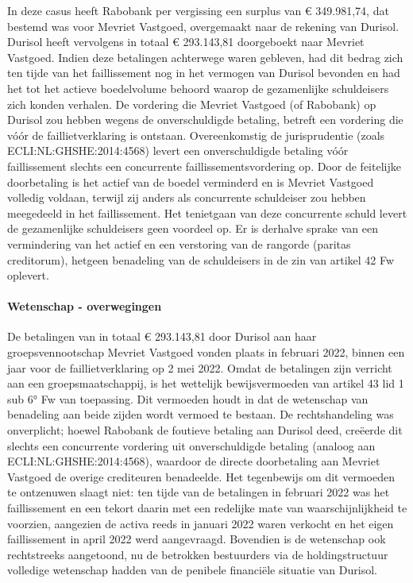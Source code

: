 \documentclass[
  dutch,
  a4paper,
]{article}
\begin{document}
In deze casus heeft Rabobank per vergissing een surplus van € 349.981,74, dat bestemd was voor Mevriet Vastgoed, overgemaakt naar de rekening van Durisol. Durisol heeft vervolgens in totaal € 293.143,81 doorgeboekt naar Mevriet Vastgoed. Indien deze betalingen achterwege waren gebleven, had dit bedrag zich ten tijde van het faillissement nog in het vermogen van Durisol bevonden en had het tot het actieve boedelvolume behoord waarop de gezamenlijke schuldeisers zich konden verhalen. De vordering die Mevriet Vastgoed (of Rabobank) op Durisol zou hebben wegens de onverschuldigde betaling, betreft een vordering die vóór de faillietverklaring is ontstaan. Overeenkomstig de jurisprudentie (zoals ECLI:NL:GHSHE:2014:4568) levert een onverschuldigde betaling vóór faillissement slechts een concurrente faillissementsvordering op. Door de feitelijke doorbetaling is het actief van de boedel verminderd en is Mevriet Vastgoed volledig voldaan, terwijl zij anders als concurrente schuldeiser zou hebben meegedeeld in het faillissement. Het tenietgaan van deze concurrente schuld levert de gezamenlijke schuldeisers geen voordeel op. Er is derhalve sprake van een vermindering van het actief en een verstoring van de rangorde (paritas creditorum), hetgeen benadeling van de schuldeisers in de zin van artikel 42 Fw oplevert.

\paragraph{Wetenschap - overwegingen}\label{wetenschap---overwegingen-14}

De betalingen van in totaal € 293.143,81 door Durisol aan haar groepsvennootschap Mevriet Vastgoed vonden plaats in februari 2022, binnen een jaar voor de faillietverklaring op 2 mei 2022. Omdat de betalingen zijn verricht aan een groepsmaatschappij, is het wettelijk bewijsvermoeden van artikel 43 lid 1 sub 6° Fw van toepassing. Dit vermoeden houdt in dat de wetenschap van benadeling aan beide zijden wordt vermoed te bestaan. De rechtshandeling was onverplicht; hoewel Rabobank de foutieve betaling aan Durisol deed, creëerde dit slechts een concurrente vordering uit onverschuldigde betaling (analoog aan ECLI:NL:GHSHE:2014:4568), waardoor de directe doorbetaling aan Mevriet Vastgoed de overige crediteuren benadeelde. Het tegenbewijs om dit vermoeden te ontzenuwen slaagt niet: ten tijde van de betalingen in februari 2022 was het faillissement en een tekort daarin met een redelijke mate van waarschijnlijkheid te voorzien, aangezien de activa reeds in januari 2022 waren verkocht en het eigen faillissement in april 2022 werd aangevraagd. Bovendien is de wetenschap ook rechtstreeks aangetoond, nu de betrokken bestuurders via de holdingstructuur volledige wetenschap hadden van de penibele financiële situatie van Durisol.
\end{document}
